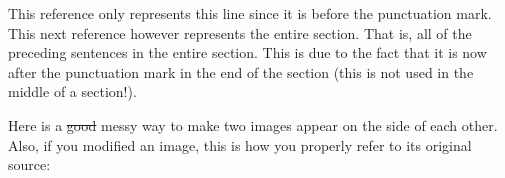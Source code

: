 \vspace{.5cm}
\noindent
This reference only represents this line since it is before the punctuation mark\cite{YDing}. This next reference however represents the entire section. That is, all of the preceding sentences in the entire section. This is due to the fact that it is now after the punctuation mark in the end of the section (this is not used in the middle of a section!).\cite{YDing}

Here is a \st{good} messy way to make two images appear on the side of each other. Also, if you modified an image, this is how you properly refer to its original source:

